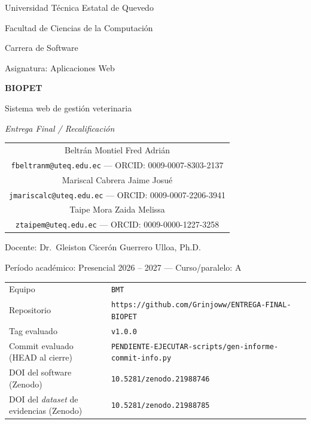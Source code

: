 \documentclass[12pt,a4paper]{article}
\providecommand{\commitactual}{PENDIENTE-EJECUTAR-scripts/gen-informe-commit-info.py}
\begin{document}

\begin{center}
  \vspace*{0.2cm}

  {\large Universidad T\'ecnica Estatal de Quevedo \par}
  {\large Facultad de Ciencias de la Computaci\'on \par}
  \vspace{0.25cm}
  {\normalsize Carrera de Software \par}
  {\normalsize Asignatura: Aplicaciones Web \par}

  \vspace{1.2cm}
  {\Huge \bfseries BIOPET \par}
  \vspace{0.35cm}
  {\Large Sistema web de gesti\'on veterinaria \par}
  \vspace{0.5cm}
  {\Large\itshape Entrega Final / Recalificaci\'on \par}

  \vspace{1.3cm}
  {\normalsize
    \begin{tabular}{c}
      Beltr\'an Montiel Fred Adri\'an \\
      \texttt{fbeltranm@uteq.edu.ec} \quad --- \quad ORCID: 0009-0007-8303-2137 \\[0.35cm]
      Mariscal Cabrera Jaime Josu\'e \\
      \texttt{jmariscalc@uteq.edu.ec} \quad --- \quad ORCID: 0009-0007-2206-3941 \\[0.35cm]
      Taipe Mora Zaida Melissa \\
      \texttt{ztaipem@uteq.edu.ec} \quad --- \quad ORCID: 0009-0000-1227-3258 \\
    \end{tabular}
    \par
  }

  \vspace{1.1cm}
  {\normalsize Docente: Dr.\ Gleiston Cicer\'on Guerrero Ulloa, Ph.D. \par}
  {\normalsize Per\'iodo acad\'emico: Presencial 2026 -- 2027 \quad --- \quad Curso/paralelo: A \par}

  \vspace{1.0cm}
  {\footnotesize
    \begin{tabular}{ll}
      Equipo & \texttt{BMT} \\
      Repositorio & \texttt{https://github.com/\allowbreak Grinjoww/\allowbreak ENTREGA-FINAL-BIOPET} \\
      Tag evaluado & \texttt{v1.0.0} \\
      Commit evaluado (HEAD al cierre) & \texttt{\commitactual} \\
      DOI del software (Zenodo) & \texttt{10.5281/zenodo.21988746} \\
      DOI del \emph{dataset} de evidencias (Zenodo) & \texttt{10.5281/zenodo.21988785} \\
    \end{tabular}
    \par
  }


\end{center}
\end{document}
